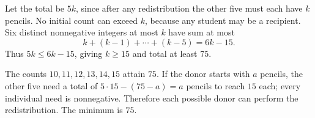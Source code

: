 Let the total be $5k$, since after any redistribution the other five must each have $k$ pencils. No initial count can exceed $k$, because any student may be a recipient. Six distinct nonnegative integers at most $k$ have sum at most
\[
k+(k-1)+\cdots+(k-5)=6k-15.
\]
Thus $5k\le6k-15$, giving $k\ge15$ and total at least $75$.

The counts $10,11,12,13,14,15$ attain $75$. If the donor starts with $a$ pencils, the other five need a total of $5\cdot15-(75-a)=a$ pencils to reach $15$ each; every individual need is nonnegative. Therefore each possible donor can perform the redistribution. The minimum is $\boxed{75}$.

